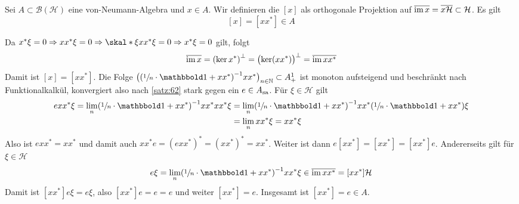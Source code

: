 \begin{definitionP}[label=def:610]
	Sei $A \subset \mathcal{B}(\mathcal{H})$ eine von-Neumann-Algebra und $x \in A$.
	Wir definieren die  $[x]$ als orthogonale Projektion auf $\overline{\im x} = \overline{x \mathcal{H}} \subset \mathcal{H}$. 
	Es gilt
	\[
		[x] = [xx^*] \in A
	\]
\end{definitionP}
\begin{beweis}
	Da $x^* \xi=0 \Rightarrow xx^* \xi=0 \Rightarrow \skal*{\xi}{xx^*\xi}=0 \Rightarrow x^* \xi=0$ gilt, folgt
	\[
		\overline{\im x} = \enbrace*{\ker x^*}^\bot = \enbrace[\big]{\ker (xx^*)}^\bot = \overline{\im xx^*}
	\]
	Damit ist $[x]=[xx^*]$. 
	Die Folge $\enbrace[\big]{\enbrace*{\sfrac{1}{n} \cdot \ind + xx^*}^{-1} xx^*}_{n \in \mathbb{N}} \subset A_+^1$ ist monoton aufsteigend und beschränkt nach Funktionalkalkül, konvergiert also nach \autoref{satz:62} stark gegen ein $e \in A_\sa$.
	Für $\xi \in \mathcal{H}$ gilt
	\begin{align}
		e xx^* \xi = \lim_n \enbrace*{\sfrac{1}{n} \cdot \ind + xx^*}^{-1} xx^* xx^* \xi &= \lim_n \enbrace*{\sfrac{1}{n} \cdot \ind + xx^*}^{-1} xx^* \enbrace*{\sfrac{1}{n} \cdot \ind + xx^*} \xi \\
		&= \lim_n xx^* \xi = xx^* \xi
	\end{align}
	Also ist $exx^* = xx^*$ und damit auch $xx^*e=(e xx^*)^* = (xx^*)^* = xx^*$.
	Weiter ist dann $e[xx^*] = [xx^*] = [xx^*]e$.
	Andererseits gilt für $\xi \in \mathcal{H}$
	\begin{align}
		e \xi = \lim_n \enbrace*{\sfrac{1}{n} \cdot \ind + xx^*}^{-1} xx^* \xi \in \overline{\im xx^*}= [xx^*] \mathcal{H}
	\end{align}
	Damit ist $[xx^*]e \xi = e \xi$, also $[xx^*]e=e= e$ und weiter $ [xx^*]=e$. 
	Insgesamt ist $[xx^*]=e \in A$.
\end{beweis}

